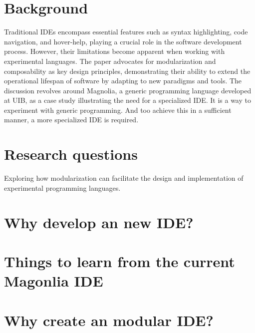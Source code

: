 \documentclass[runningheads]{llncs}
\begin{document}
\section{Background}

Traditional IDEs encompass essential features such as syntax highlighting, code
navigation, and hover-help, playing a crucial role in the software development
process. However, their limitations become apparent when working with
experimental languages.
The paper advocates for modularization and composability
as key design principles, demonstrating their ability to extend the operational
lifespan of software by adapting to new paradigms and tools. The discussion
revolves around Magnolia, a generic programming language developed at UIB, as a
case study illustrating the need for a specialized IDE. It is a way to
experiment with generic programming. And too achieve this in a sufficient
manner, a more specialized IDE is required.

\section{Research questions}

Exploring how modularization can facilitate the design and implementation of
experimental programming languages.

\section{Why develop an new IDE?}

\section{Things to learn from the current Magonlia IDE}

\section{Why create an modular IDE?}
\end{document}
